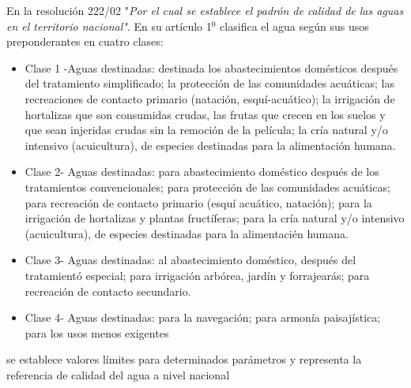 En la resoluci\'on 222/02 "\textit{Por el cual se establece el padr\'on de calidad de las aguas en el territorio nacional"}. En su art\'iculo 1$^{0}$ clasifica el agua seg\'un sus usos preponderantes en cuatro clases:\cite{la-secretaria-del-ambiente-2002}
\begin{itemize}
    \item Clase 1 -Aguas destinadas: 
    destinada los abastecimientos dom\'esticos despu\'es del tratamiento simplificado; 
    la protecci\'on de las comunidades acu\'aticas;
    las recreaciones de contacto primario (nataci\'on, esqu\'i-acu\'atico); 
    la irrigaci\'on de hortalizas que son consumidas crudas, las frutas que crecen en los suelos y que sean injeridas crudas sin la remoci\'on de la pel\'icula; 
    la cr\'ia natural y/o intensivo (acuicultura), de especies destinadas para la alimentaci\'on humana.
    \item Clase 2- Aguas destinadas:
    para abastecimiento dom\'estico después de los tratamientos convencionales; 
    para protección de las comunidades acuáticas; para recreación de contacto primario (esquí acuático, natación); 
    para la irrigación de hortalizas y plantas fruct\'iferas; 
    para la cría natural y/o intensivo (acuicultura), de especies destinadas para la alimentaci\'en humana.
    \item Clase 3- Aguas destinadas: 
    al abastecimiento dom\'estico, despu\'es del tratamient\'o especial; 
    para irrigación arbórea, jardín y forrajear\'as; 
    para recreaci\'on de contacto secundario.
    \item Clase 4- Aguas destinadas: 
    para la navegación; 
    para armonía paisaj\'istica; 
    para los usos menos exigentes
\end{itemize}


se establece valores l\'imites para determinados parámetros y representa la referencia de calidad del agua a nivel nacional

